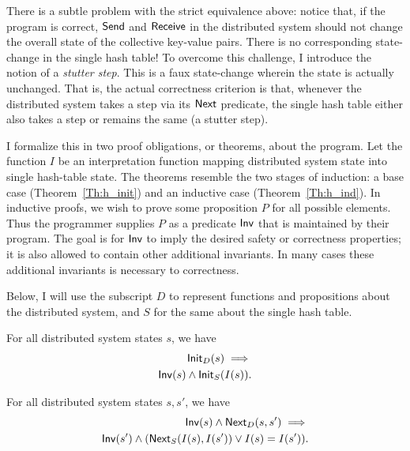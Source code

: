 There is a subtle problem with the strict equivalence above: notice that, if the
program is correct, \(\mathsf{Send}\) and \(\mathsf{Receive}\) in the distributed
system should not change the overall state of the collective key-value pairs.
There is no corresponding state-change in the single hash table! To overcome
this challenge, I introduce the notion of a \emph{stutter step}. This is a faux
state-change wherein the state is actually unchanged. That is, the actual
correctness criterion is that, whenever the distributed system takes a step via
its \(\mathsf{Next}\) predicate, the single hash table either also takes a step or
remains the same (a stutter step).

I formalize this in two proof obligations, or theorems, about the program. Let
the function \(I\) be an interpretation function mapping distributed system
state into single hash-table state. The theorems resemble the two stages of
induction: a base case (Theorem~\ref{Th:h_init}) and an inductive case
(Theorem~\ref{Th:h_ind}). In inductive proofs, we wish to prove some proposition
\(P\) for all possible elements. Thus the programmer supplies \(P\) as a
predicate \(\mathsf{Inv}\) that is maintained by their program. The goal is for
\(\mathsf{Inv}\) to imply the desired safety or correctness properties; it is also
allowed to contain other additional invariants. In many cases these additional
invariants is necessary to correctness.

Below, I will use the subscript \(D\) to represent functions and propositions
about the distributed system, and \(S\) for the same about the single hash
table.

\begin{thm}\label{Th:h_init}
    For all distributed system states \(s\), we have
    \begin{align*}
        \mathsf{Init}_{D}(s) \implies \\
        \mathsf{Inv}(s) \land \mathsf{Init}_{S}(I(s)).
    \end{align*}
\end{thm}

\begin{thm}\label{Th:h_ind}
    For all distributed system states \(s, s'\), we have
    \begin{align*}
        \mathsf{Inv}(s) \land \mathsf{Next}_{D}(s, s') \implies \\
        \mathsf{Inv}(s') \land (\mathsf{Next}_{S}(I(s), I(s')) \lor I(s) = I(s')).
    \end{align*}
\end{thm}

